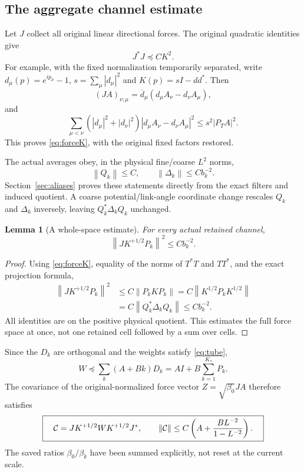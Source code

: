 \documentclass[11pt,letterpaper]{article}
\newtheorem{lemma}[theorem]{Lemma}
\theoremstyle{remark}\newtheorem{remark}[theorem]{Remark}
\newcommand{\norm}[1]{\left\lVert#1\right\rVert}
\begin{document}
\subsection{The aggregate channel estimate}

Let \(J\) collect all original linear directional forces. The original quadratic identities give
\begin{equation}\label{eq:forceK}
 J^*J\preceq CK^2.
\end{equation}
For example, with the fixed normalization temporarily separated, write
\(d_\mu(p)=e^{ip_\mu}-1\), \(s=\sum_\mu|d_\mu|^2\) and
\(K(p)=sI-dd^*\). Then
\[
 (JA)_{\nu;\mu}=\overline d_\mu(d_\mu A_\nu-d_\nu A_\mu),
\]
and
\[
 \sum_{\mu<\nu}(|d_\mu|^2+|d_\nu|^2)
 |d_\mu A_\nu-d_\nu A_\mu|^2
 \le s^2|P_TA|^2.
\]
This proves \eqref{eq:forceK}, with the original fixed factors restored.

The actual averages obey, in the physical fine/coarse \(L^2\) norms,
\begin{equation}\label{eq:Qbounds}
 \norm{Q_k}\le C,\qquad \norm{\Delta_k}\le Cb_k^{-2}.
\end{equation}
Section~\ref{sec:aliases} proves these statements directly from the exact filters and induced quotient. A coarse potential/link-angle coordinate change rescales \(Q_k\) and \(\Delta_k\) inversely, leaving \(Q_k^*\Delta_kQ_k\) unchanged.

\begin{lemma}[A whole-space estimate]\label{lem:channel}
For every actual retained channel,
\begin{equation}\label{eq:channel}
 \norm{JK^{+1/2}P_k}^2\le Cb_k^{-2}.
\end{equation}
\end{lemma}
\begin{proof}
Using \eqref{eq:forceK}, equality of the norms of \(T^*T\) and \(TT^*\), and the exact projection formula,
\begin{align*}
 \norm{JK^{+1/2}P_k}^2
 &\le C\norm{P_kKP_k}
 =C\norm{K^{1/2}P_kK^{1/2}}\\
 &=C\norm{Q_k^*\Delta_kQ_k}
 \le Cb_k^{-2}.
\end{align*}
All identities are on the positive physical quotient. This estimates the full force space at once, not one retained cell followed by a sum over cells.
\end{proof}

Since the \(D_k\) are orthogonal and the weights satisfy \eqref{eq:tube},
\begin{equation}\label{eq:Wbound}
 W\preceq\sum_k(A+Bk)D_k
 =AI+B\sum_{k=1}^{K_*}P_k.
\end{equation}
The covariance of the original-normalized force vector \(Z=\sqrt{\beta_0}JA\) therefore satisfies
\begin{equation}\label{eq:Cbound}
 \boxed{\quad
 \cC=JK^{+1/2}WK^{+1/2}J^*,\qquad
 \norm{\cC}\le C\left(A+\frac{BL^{-2}}{1-L^{-2}}\right).
 \quad}
\end{equation}
The saved ratios \(\beta_0/\beta_k\) have been summed explicitly, not reset at the current scale.
\end{document}
